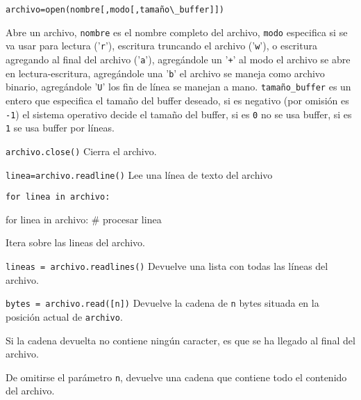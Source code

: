 \begin{referencia_python}

\begin{sintaxis}{\lstinline{archivo=open(nombre[,modo[,tamaño\_buffer]])}}

Abre un archivo, \texttt{nombre} es el nombre completo del archivo,
\texttt{modo} especifica si se va usar para lectura ('\verb!r!'), escritura
truncando el archivo ('\verb!w!'), o escritura agregando al final del archivo
('\verb!a!'), agregándole un '\verb!+!' al modo el archivo se abre en
lectura-escritura, agregándole una '\verb!b!' el archivo se maneja como archivo
binario, agregándole '\verb!U!' los fin de línea se manejan a mano.
\texttt{tamaño\_buffer} es un entero que especifica el tamaño del buffer
deseado, si es negativo (por omisión es \verb!-1!) el sistema operativo decide
el tamaño del buffer, si es \verb!0! no se usa buffer, si es \verb!1! se usa
buffer por líneas.
\end{sintaxis}

\begin{sintaxis}{\lstinline!archivo.close()!}
Cierra el archivo.
\end{sintaxis}

\begin{sintaxis}{\lstinline!linea=archivo.readline()!}
Lee una línea de texto del archivo
\end{sintaxis}

\begin{sintaxis}{\lstinline!for linea in archivo:!}
\begin{codigo-python-sn}
for linea in archivo:
	# procesar linea
\end{codigo-python-sn}

Itera sobre las lineas del archivo.
\end{sintaxis}

\begin{sintaxis}{\lstinline!lineas = archivo.readlines()!}
Devuelve una lista con todas las líneas del archivo.
\end{sintaxis}

\begin{sintaxis}{\lstinline!bytes = archivo.read([n])!}
Devuelve la cadena de \lstinline!n! bytes situada en la posición actual de
\lstinline!archivo!.

Si la cadena devuelta no contiene ningún caracter, es que se ha llegado al
final del archivo.

De omitirse el parámetro \lstinline!n!, devuelve una cadena que contiene
todo el contenido del archivo.
\end{sintaxis}


\end{referencia_python}
